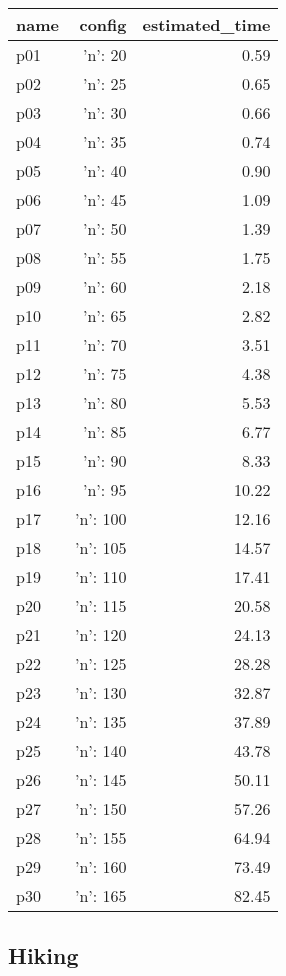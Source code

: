 \documentclass{article}
\begin{document}
                            \begin{center}
                            \scriptsize
                            \begin{tabular}{@{}l|r|r@{}}
                            name & config & estimated\_time\\\midrule
                              p01&{'n': 20}&0.59\\
  p02&{'n': 25}&0.65\\
  p03&{'n': 30}&0.66\\
  p04&{'n': 35}&0.74\\
  p05&{'n': 40}&0.90\\
  p06&{'n': 45}&1.09\\
  p07&{'n': 50}&1.39\\
  p08&{'n': 55}&1.75\\
  p09&{'n': 60}&2.18\\
  p10&{'n': 65}&2.82\\
  p11&{'n': 70}&3.51\\
  p12&{'n': 75}&4.38\\
  p13&{'n': 80}&5.53\\
  p14&{'n': 85}&6.77\\
  p15&{'n': 90}&8.33\\
  p16&{'n': 95}&10.22\\
  p17&{'n': 100}&12.16\\
  p18&{'n': 105}&14.57\\
  p19&{'n': 110}&17.41\\
  p20&{'n': 115}&20.58\\
  p21&{'n': 120}&24.13\\
  p22&{'n': 125}&28.28\\
  p23&{'n': 130}&32.87\\
  p24&{'n': 135}&37.89\\
  p25&{'n': 140}&43.78\\
  p26&{'n': 145}&50.11\\
  p27&{'n': 150}&57.26\\
  p28&{'n': 155}&64.94\\
  p29&{'n': 160}&73.49\\
  p30&{'n': 165}&82.45
                            \end{tabular}
                            \end{center}
                    
                            \newpage \subsection{Hiking}
\end{document}
